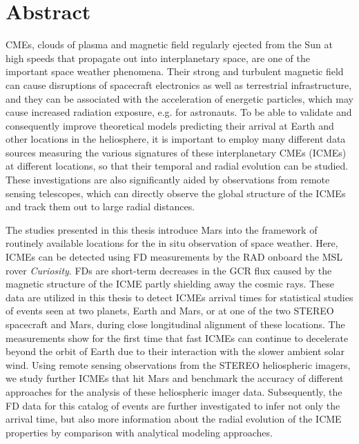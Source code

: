 \chapter*{Abstract}

\Acp{CME}, clouds of plasma and magnetic field regularly ejected from the Sun at high speeds that propagate out into interplanetary space, are one of the important space weather phenomena.
Their strong and turbulent magnetic field can cause disruptions of spacecraft electronics as well as terrestrial infrastructure, and they can be associated with the acceleration of energetic particles, which may cause increased radiation exposure, e.g. for astronauts.
To be able to validate and consequently improve theoretical models predicting their arrival at Earth and other locations in the heliosphere, it is important to employ many different data sources measuring the various signatures of these interplanetary \acp{CME} (\acsp{ICME}) at different locations, so that their temporal and radial evolution can be studied. These investigations are also significantly aided by observations from remote sensing telescopes, which can directly observe the global structure of the \acp{ICME} and track them out to large radial distances.

The studies presented in this thesis introduce Mars into the framework of routinely available locations for the in situ observation of space weather. Here, \acp{ICME} can be detected using \acl{FD} measurements by the \ac{RAD} onboard the \acl{MSL} rover \textit{Curiosity}. \aclp{FD} are short-term decreases in the \acl{GCR} flux caused by the magnetic structure of the \ac{ICME} partly shielding away the cosmic rays.
These data are utilized in this thesis to detect \acp{ICME} arrival times for statistical studies of events seen at two planets, Earth and Mars, or at one of the two \acs{STEREO} spacecraft and Mars, during close longitudinal alignment of these locations.
The measurements show for the first time that fast \acp{ICME} can continue to decelerate beyond the orbit of Earth due to their interaction with the slower ambient solar wind.
Using remote sensing observations from the \acs{STEREO} heliospheric imagers, we study further \acp{ICME} that hit Mars and benchmark the accuracy of different approaches for the analysis of these heliospheric imager data.
Subsequently, the \acl{FD} data for this catalog of events are further investigated to infer not only the arrival time, but also more information about the radial evolution of the \ac{ICME} properties by comparison with analytical modeling approaches.

